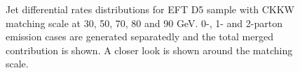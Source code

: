 \begin{figure}[h!]
{	}
	\hfill
	\hfill
  \caption{Jet differential rates distributions for EFT D5 sample with CKKW matching scale at 30, 50, 70, 80 and 90 GeV. 0-, 1- and 2-parton emission cases are generated separatedly and the total merged contribution is shown. A closer look is shown around the matching scale.}
  \label{fig:CKKW_D5_zoom}
\end{figure}


